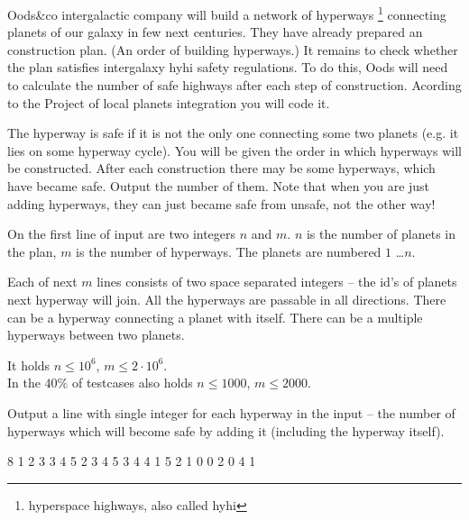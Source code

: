 





Oods\&co intergalactic company will build a network of hyperways
\footnote{hyperspace highways, also called hyhi}
connecting planets of our galaxy in few next centuries.
They have already prepared an construction plan.
(An order of building hyperways.)
It remains to check whether the plan satisfies
intergalaxy hyhi safety regulations.
To do this, Oods will need to calculate
the number of safe highways
after each step of construction.
Acording to the
Project of local planets integration
you will code it.



The hyperway is safe
if it is not the only one connecting
some two planets
(e.g. it lies on some hyperway cycle).
You will be given the order in which hyperways
will be constructed.
After each construction there may
be some hyperways, which have became safe.
Output the number of them.
Note that when you are just adding hyperways,
they can just became safe from unsafe,
not the other way!



On the first line of input are two integers $n$ and $m$.
$n$ is the number of planets in the plan,
$m$ is the number of hyperways.
The planets are numbered $1$ \dots $n$.

Each of next $m$ lines consists
of two space separated integers --
the id's of planets next hyperway will join.
All the hyperways are passable in all directions.
There can be a hyperway connecting a planet with itself.
There can be a multiple hyperways between two planets.

\smallskip

It holds $n \leq 10^6$, $m \leq 2\cdot10^6$.\\
In the $40\%$ of testcases also holds
$n \leq 1000$, $m \leq 2000$.


Output a line with single integer for each hyperway in the input --
the number of hyperways which will become safe by adding it
(including the hyperway itself).



 8
1 2
3 3
4 5
2 3
4 5
3 4
4 1
5 2
1
0
0
2
0
4
1
\sampleEND


